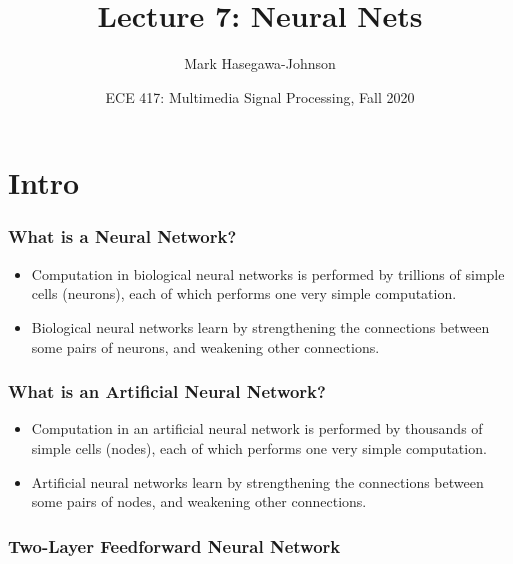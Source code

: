 \documentclass{beamer}
\title{Lecture 7: Neural Nets}
\author{Mark Hasegawa-Johnson}
\date{ECE 417: Multimedia Signal Processing, Fall 2020}
\begin{document}
\begin{frame}
  \maketitle
\end{frame}

\begin{frame}
  \tableofcontents
\end{frame}


\section{Intro}
\setcounter{subsection}{1}
\begin{frame}
  \frametitle{What is a Neural Network?}
  \begin{itemize}
  \item Computation in biological neural networks is performed by
    trillions of simple cells (neurons), each of which performs one
    very simple computation.
  \item Biological neural networks learn by strengthening  the connections
    between some pairs of neurons, and weakening other connections.
  \end{itemize}
\end{frame}

\begin{frame}
  \frametitle{What is an Artificial Neural Network?}
  \begin{itemize}
  \item Computation in an artificial neural network is performed by
    thousands of simple cells (nodes), each of which performs one
    very simple computation.
  \item Artificial neural networks learn by strengthening  the connections
    between some pairs of nodes, and weakening other connections.
  \end{itemize}
\end{frame}

\begin{frame}
  \frametitle{Two-Layer Feedforward Neural Network}
  \begin{small}\end{small}
\end{frame}
\end{document}
